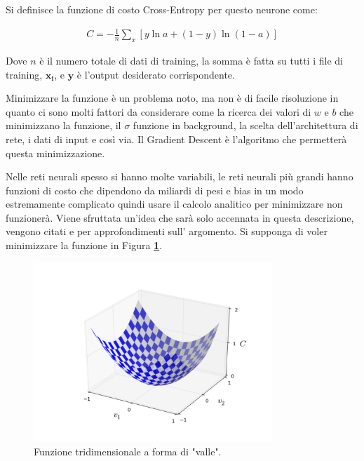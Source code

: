 Si definisce la funzione di costo Cross-Entropy per questo neurone come: %

\begin{eqnarray} 
  C = -\frac{1}{n} \sum_x \left[y \ln a + (1-y ) \ln (1-a) \right]
\end{eqnarray}

Dove $n$ è il numero totale di dati di training, la somma è fatta su tutti i file di training, $\mathbf{x_i}$, e $\mathbf{y}$ è l'output desiderato corrispondente.

Minimizzare la funzione è un problema noto, ma non è di facile risoluzione in quanto ci sono molti fattori da considerare come la ricerca dei valori di $w$ e $b$ che minimizzano la funzione, il $\sigma$ funzione in background, la scelta dell'architettura di rete, i dati di input e così via. Il Gradient Descent è l'algoritmo che permetterà questa minimizzazione.

Nelle reti neurali spesso si hanno molte variabili, le reti neurali più grandi hanno funzioni di costo che dipendono da miliardi di pesi e bias in un modo estremamente complicato quindi usare il calcolo analitico per minimizzare non funzionerà. Viene sfruttata un'idea che sarà solo accennata in questa descrizione, vengono citati \cite{Goodfellow-et-al-2016} e \cite[91-94]{Kriesel2007NeuralNetworks} per approfondimenti sull' argomento. Si supponga di voler minimizzare la funzione in Figura \textbf{\ref{fig:vallevuota}}.

\begin{figure}
\includegraphics[width=%
0.8\textwidth]{figures/valley}
\caption[Funzione tridimensionale a forma di "valle".]{Funzione tridimensionale a forma di "valle".
\label{fig:vallevuota}}
\end{figure} 

